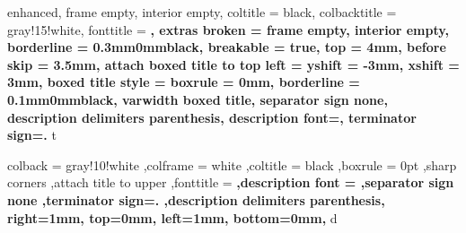{
    enhanced,
    frame empty,
    interior empty,
    coltitle = black,
    colbacktitle = gray!15!white,
    fonttitle = \bfseries,
    extras broken = {frame empty, interior empty},
    borderline = {0.3mm}{0mm}{black},
    breakable = true,
    top = 4mm,
    before skip = 3.5mm,
    attach boxed title to top left = {yshift = -3mm, xshift = 3mm},
    boxed title style = {boxrule = 0mm, borderline = {0.1mm}{0mm}{black}},
    varwidth boxed title,
    separator sign none, description delimiters parenthesis,
    description font=\bfseries,
    terminator sign={.\hspace{1mm}}
}
{t}

{
    colback = gray!10!white
    ,colframe = white
    ,coltitle = black
    ,boxrule = 0pt
    ,sharp corners
    ,attach title to upper
    ,fonttitle = \bfseries
    ,description font = \mdseries
    ,separator sign none
    ,terminator sign={.\hspace{2mm}}
    ,description delimiters parenthesis,
    right=1mm,
    top=0mm,
    left=1mm,
    bottom=0mm,
}
{d}
